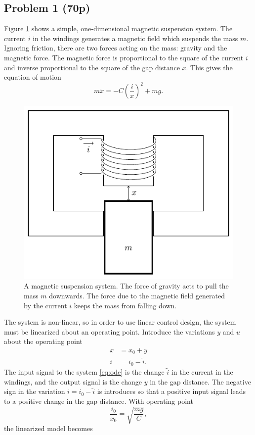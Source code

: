 \documentclass[letterpaper,12pt]{article}
\begin{document}
\subsection*{Problem 1 (70p)}
Figure \ref{fig:magnetic-suspension} shows a simple, one-dimensional magnetic suspension system. The current $i$ in the windings generates a magnetic field which suspends the mass $m$. Ignoring friction, there are two forces acting on the mass: gravity and the magnetic force. The magnetic force is proportional to the square of the current $i$ and inverse proportional to the square of the gap distance $x$. This gives the equation of motion 
\begin{equation}
m \ddot{x} = -C \left( \frac{i}{x} \right)^2 + mg.
\end{equation}
\begin{figure}[htb]
\begin{center}
\includegraphics[width=0.5\linewidth]{./magnetic-suspension}
\caption{A magnetic suspension system. The force of gravity acts to pull the mass $m$ downwards. The force due to the magnetic field generated by the current $i$ keeps the mass from falling down. }
\label{fig:magnetic-suspension} 
\end{center}
\end{figure}
The system is non-linear, so in order to use linear control design, the system must be linearized about an operating point. Introduce the variations \(y\) and \(u\) about the operating point
\begin{align*}
x &= x_0 + y \\
i &= i_0 - \tilde{i}.
\end{align*}
The input signal to the system \eqref{eq:ode} is the change  \(\tilde{i}\) in the current in the windings, and the output signal is the change \(y\)  in the gap distance. The negative sign in the variation \(i = i_0 - \tilde{i}\) is introduces so that a positive input signal leads to a positive change in the gap distance. With operating point \[\frac{i_0}{x_0} = \sqrt{\frac{mg}{C}},\] the linearized model becomes
\end{document}
